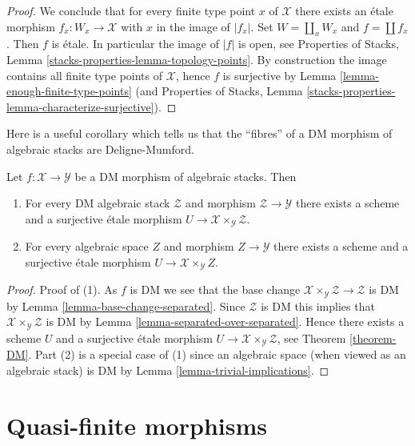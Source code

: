 \begin{proof}
\medskip\noindent
We conclude that for every finite type point $x$ of $\mathcal{X}$ there
exists an \'etale morphism $f_x : W_x \to \mathcal{X}$ with $x$ in the
image of $|f_x|$. Set $W = \coprod_x W_x$ and $f = \coprod f_x$. Then $f$
is \'etale. In particular the image of $|f|$ is open, see
Properties of Stacks, Lemma \ref{stacks-properties-lemma-topology-points}.
By construction the image contains all finite type points of $\mathcal{X}$,
hence $f$ is surjective by
Lemma \ref{lemma-enough-finite-type-points} (and
Properties of Stacks, Lemma
\ref{stacks-properties-lemma-characterize-surjective}).
\end{proof}

\noindent
Here is a useful corollary which tells us that the ``fibres'' of
a DM morphism of algebraic stacks are Deligne-Mumford.

\begin{lemma}
\label{lemma-DM}
Let $f : \mathcal{X} \to \mathcal{Y}$ be a DM morphism of algebraic
stacks. Then
\begin{enumerate}
\item For every DM algebraic stack $\mathcal{Z}$ and morphism
$\mathcal{Z} \to \mathcal{Y}$ there exists a scheme and
a surjective \'etale morphism
$U \to \mathcal{X} \times_\mathcal{Y} \mathcal{Z}$.
\item For every algebraic space $Z$ and morphism
$Z \to \mathcal{Y}$ there exists a scheme and
a surjective \'etale morphism
$U \to \mathcal{X} \times_\mathcal{Y} Z$.
\end{enumerate}
\end{lemma}

\begin{proof}
Proof of (1). As $f$ is DM we see that the base change
$\mathcal{X} \times_\mathcal{Y} \mathcal{Z} \to \mathcal{Z}$ is DM
by Lemma \ref{lemma-base-change-separated}.
Since $\mathcal{Z}$ is DM this implies that
$\mathcal{X} \times_\mathcal{Y} \mathcal{Z}$ is DM
by Lemma \ref{lemma-separated-over-separated}. Hence there exists a
scheme $U$ and a surjective \'etale morphism
$U \to \mathcal{X} \times_\mathcal{Y} \mathcal{Z}$, see
Theorem \ref{theorem-DM}.
Part (2) is a special case of (1) since an algebraic space
(when viewed as an algebraic stack) is DM by
Lemma \ref{lemma-trivial-implications}.
\end{proof}






\section{Quasi-finite morphisms}
\label{section-quasi-finite}

